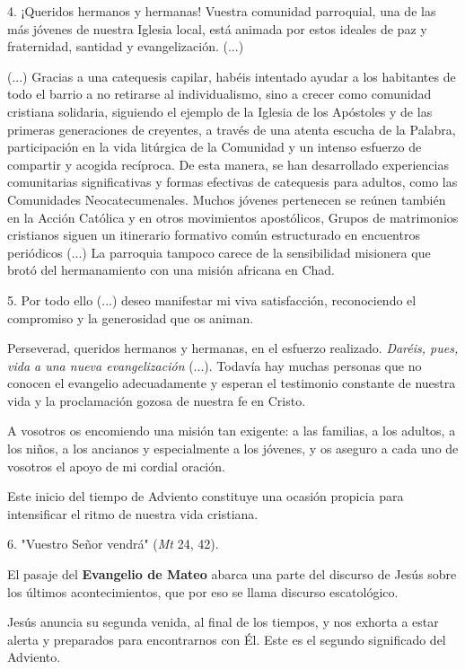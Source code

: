 \begin{body}
\begin{body}
4. ¡Queridos hermanos y hermanas! Vuestra comunidad parroquial, una de las más jóvenes de nuestra Iglesia local, está animada por estos ideales de paz y fraternidad, santidad y evangelización. (...)

(...) Gracias a una catequesis capilar, habéis intentado ayudar a los habitantes de todo el barrio a no retirarse al individualismo, sino a crecer como comunidad cristiana solidaria, siguiendo el ejemplo de la Iglesia de los Apóstoles y de las primeras generaciones de creyentes, a través de una atenta escucha de la Palabra, participación en la vida litúrgica de la Comunidad y un intenso esfuerzo de compartir y acogida recíproca. De esta manera, se han desarrollado experiencias comunitarias significativas y formas efectivas de catequesis para adultos, como las Comunidades Neocatecumenales. Muchos jóvenes pertenecen se reúnen también en la Acción Católica y en otros movimientos apostólicos, Grupos de matrimonios cristianos siguen un itinerario formativo común estructurado en encuentros periódicos (...) La parroquia tampoco carece de la sensibilidad misionera que brotó del hermanamiento con una misión africana en Chad.

5. Por todo ello (...) deseo manifestar mi viva satisfacción, reconociendo el compromiso y la generosidad que os animan.

Perseverad, queridos hermanos y hermanas, en el esfuerzo realizado. \emph{Daréis, pues, vida a una nueva evangelización} (...). Todavía hay muchas personas que no conocen el evangelio adecuadamente y esperan el testimonio constante de nuestra vida y la proclamación gozosa de nuestra fe en Cristo.

A vosotros os encomiendo una misión tan exigente: a las familias, a los adultos, a los niños, a los ancianos y especialmente a los jóvenes, y os aseguro a cada uno de vosotros el apoyo de mi cordial oración.

Este inicio del tiempo de Adviento constituye una ocasión propicia para intensificar el ritmo de nuestra vida cristiana.

6. "Vuestro Señor vendrá" (\emph{Mt} 24, 42).

El pasaje del \textbf{Evangelio de Mateo} abarca una parte del discurso de Jesús sobre los últimos acontecimientos, que por eso se llama discurso escatológico.

Jesús anuncia su segunda venida, al final de los tiempos, y nos exhorta a estar alerta y preparados para encontrarnos con Él. Este es el segundo significado del Adviento.


\end{body}
\end{body}
